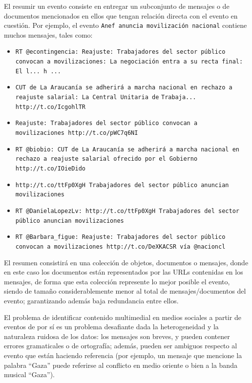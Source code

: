 \documentclass[upright, contnum]{umemoria}
\begin{document}
  El resumir un evento consiste en entregar un subconjunto de
  mensajes o de documentos mencionados en ellos que tengan
  relación directa con el evento en cuestión. Por ejemplo, el evento
  \texttt{Anef anuncia movilización nacional} contiene muchos mensajes, tales
  como:
\begin{itemize}
\item \texttt{RT @econtingencia: Reajuste: Trabajadores del sector público}
    \texttt{convocan a movilizaciones: La negociación entra a su recta final:}
    \texttt{El l... h ...}
\item \texttt{CUT de La Araucanía se adherirá a marcha nacional en rechazo a}
    \texttt{reajuste salarial: La Central Unitaria de}
    \texttt{Trabaja... http://t.co/IcgohlTR}
\item \texttt{Reajuste: Trabajadores del sector público convocan a}\\
    \texttt{movilizaciones http://t.co/pWC7q6NI}
\item \texttt{RT @biobio: CUT de La Araucanía se adherirá a marcha nacional en}
    \texttt{rechazo a reajuste salarial ofrecido por el Gobierno}
    \texttt{http://t.co/IOieDido}
\item \texttt{http://t.co/ttFp0XgH Trabajadores del sector público anuncian}
    \texttt{movilizaciones}
\item \texttt{RT @DanielaLopezLv: http://t.co/ttFp0XgH Trabajadores del sector}
    \texttt{público anuncian movilizaciones}
\item \texttt{RT @Barbara\_figue: Reajuste: Trabajadores del sector público}
    \texttt{convocan a movilizaciones http://t.co/DeXKACSR vía @nacioncl}
\end{itemize}
  El resumen consistirá en una colección de objetos, documentos o
  mensajes, donde en este caso los documentos están representados por
  las URLs contenidas en los mensajes, de forma que esta colección
  represente lo mejor posible el evento, siendo de tamaño
  considerablemente menor al total de mensajes/documentos del evento;
  garantizando además baja redundancia entre ellos.

  El problema de identificar contenido multimedial en medios sociales
  a partir de eventos de por sí es un problema desafiante dada la
  heterogeneidad y la naturaleza ruidosa de los datos: los mensajes
  son breves, y pueden contener errores gramaticales o de ortografía;
  además, pueden ser ambiguos respecto al evento que están haciendo
  referencia (por ejemplo, un mensaje que mencione la palabra ``Gaza''
  puede referirse al conflicto en medio oriente o bien a la banda
  musical ``Gaza''). 
\end{document}
